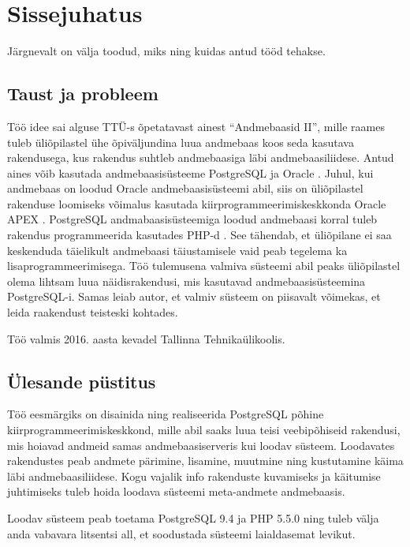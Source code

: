 \documentclass[a4paper,12pt]{article} %
\begin{document}
\section{Sissejuhatus}
\label{Sissejuhatus} %
Järgnevalt on välja toodud, miks ning kuidas antud tööd tehakse.

\subsection{Taust ja probleem}
Töö idee sai alguse TTÜ-s õpetatavast ainest ``Andmebaasid II'', mille raames tuleb üliõpilastel ühe õpiväljundina luua andmebaas koos seda kasutava rakendusega, kus rakendus suhtleb andmebaasiga läbi andmebaasiliidese. Antud aines võib kasutada andmebaasisüsteeme PostgreSQL \cite{PostgreSQL} ja Oracle \cite{Oracle_DB}. Juhul, kui andmebaas on loodud Oracle andmebaasisüsteemi abil, siis on üliõpilastel rakenduse loomiseks võimalus kasutada kiirprogrammeerimiskeskkonda Oracle APEX \cite{Oracle_APEX}. PostgreSQL andmabaasisüsteemiga loodud andmebaasi korral tuleb rakendus programmeerida kasutades PHP-d \cite{PHP}. See tähendab, et üliõpilane ei saa keskenduda täielikult andmebaasi täiustamisele vaid peab tegelema ka lisaprogrammeerimisega. Töö tulemusena valmiva süsteemi abil peaks üliõpilastel olema lihtsam luua näidisrakendusi, mis kasutavad andmebaasisüsteemina PostgreSQL-i. Samas leiab autor, et valmiv süsteem on piisavalt võimekas, et leida raakendust teisteski kohtades.\par
Töö valmis 2016. aasta kevadel Tallinna Tehnikaülikoolis.

\subsection{Ülesande püstitus}
Töö eesmärgiks on disainida ning realiseerida PostgreSQL põhine kiirprogrammeerimiskeskkond, mille abil saaks luua teisi veebipõhiseid rakendusi, mis hoiavad andmeid samas andmebaasiserveris kui loodav süsteem. Loodavates rakendustes peab andmete pärimine, lisamine, muutmine ning kustutamine käima läbi andmebaasiliidese. Kogu vajalik info rakenduste kuvamiseks ja käitumise juhtimiseks tuleb hoida loodava süsteemi meta-andmete andmebaasis.\par
Loodav süsteem peab toetama PostgreSQL 9.4 ja PHP 5.5.0 ning tuleb välja anda vabavara litsentsi all, et soodustada süsteemi laialdasemat levikut.
\end{document}
